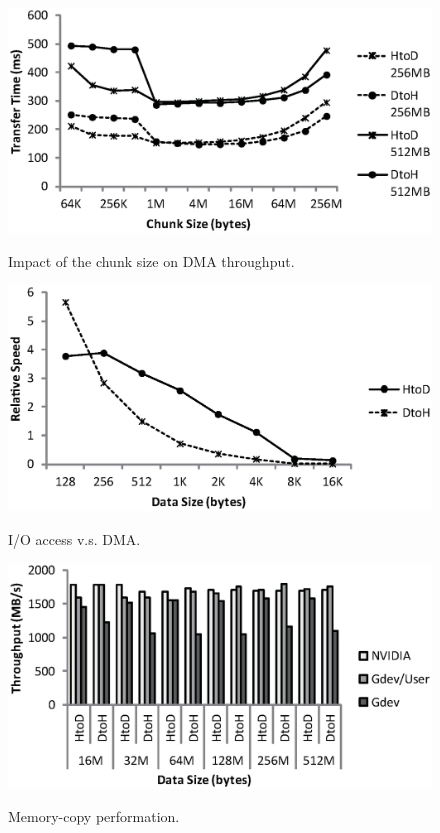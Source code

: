 \begin{figure}[t]
 \begin{center}
  \includegraphics[width=0.95\hsize]{eps/chunk.eps}\\
  \vspace{-1.5em}
  \caption{Impact of the chunk size on DMA throughput.}
  \label{fig:chunk}
 \end{center}
 \begin{center}
  \includegraphics[width=0.95\hsize]{eps/dma.eps}\\
  \vspace{-1.5em}
  \caption{I/O access v.s. DMA.}
  \label{fig:io_access}
 \end{center}
 \begin{center}
  \includegraphics[width=\hsize]{eps/memcpy.eps}\\
  \vspace{-1.5em}
  \caption{Memory-copy performation.}
  \label{fig:memcpy}
 \end{center}
 \vspace{-1.5em}
\end{figure}

